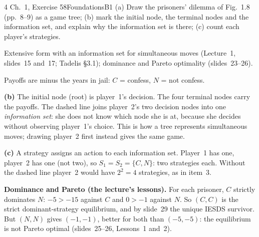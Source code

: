 \begin{exsol}{4}{\MG{} Ch.~1, Exercise 5}{8}{Foundations}{B1}
\asked (a) Draw the prisoners' dilemma of Fig.~1.8 (pp.~8--9) as a game tree; (b) mark the
initial node, the terminal nodes and the information set, and explain why the information set is
there; (c) count each player's strategies.

\method Extensive form with an information set for simultaneous moves (Lecture~1, slides~15
and~17; Tadelis \S3.1); dominance and Pareto optimality (slides~23--26).

\solution
Payoffs are minus the years in jail: $C$ = confess, $N$ = not confess.
\begin{center}
\end{center}

\textbf{(b)} The initial node (root) is player~1's decision. The four terminal nodes carry the
payoffs. The dashed line joins player~2's two decision nodes into one \emph{information set}:
she does not know which node she is at, because she decides without observing player~1's choice.
This is how a tree represents simultaneous moves; drawing player~2 first instead gives the same
game.

\textbf{(c)} A strategy assigns an action to each information set. Player~1 has one, player~2
has one (not two), so $S_1 = S_2 = \{C, N\}$: two strategies each. Without the dashed line
player~2 would have $2^2 = 4$ strategies, as in item~3.

\textbf{Dominance and Pareto (the lecture's lessons).} For each prisoner, $C$ strictly dominates
$N$: $-5 > -15$ against $C$ and $0 > -1$ against $N$. So $(C,C)$ is the strict dominant-strategy
equilibrium, and by slide~29 the unique IESDS survivor. But $(N,N)$ gives $(-1,-1)$, better for
both than $(-5,-5)$: the equilibrium is not Pareto optimal (slides~25--26, Lessons~1 and~2).


\end{exsol}
